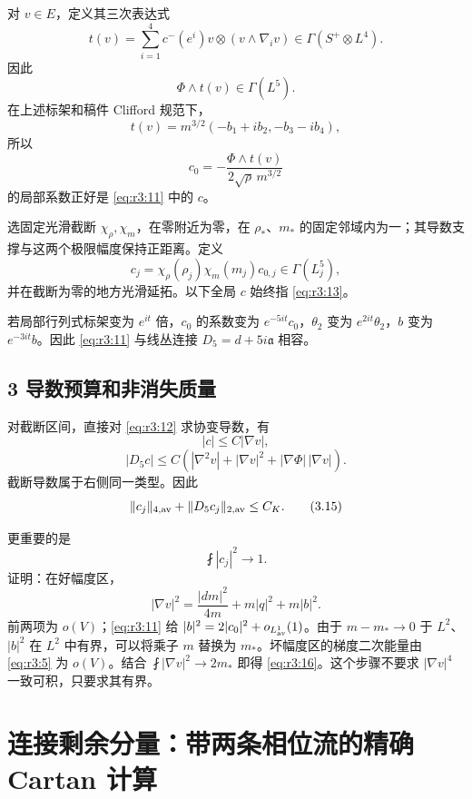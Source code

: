 \documentclass[UTF8,11pt,openany,oneside,fontset=none]{ctexbook}
\begin{document}
对 \(v\in E\)，定义其三次表达式 \[
 t(v)=\sum_{i=1}^4 c^-(e^i)v\otimes(v\wedge\nabla_i v)
       \in\Gamma(S^+\otimes L^4).
\] 因此 \[
 \Phi\wedge t(v)\in\Gamma(L^5).
\] 在上述标架和稿件 Clifford 规范下， \[
 t(v)=m^{3/2}(-b_1+ib_2,-b_3-ib_4),
\] 所以 \[
 c_0=-\frac{\Phi\wedge t(v)}{2\sqrt\rho\,m^{3/2}}
 \tag{3.12}\label{eq:r3:12}
\] 的局部系数正好是 \eqref{eq:r3:11} 中的 \(c\)。

选固定光滑截断 \(\chi_\rho,\chi_m\)，在零附近为零，在 \(\rho_*\)、\(m_*\) 的固定邻域内为一；其导数支撑与这两个极限幅度保持正距离。定义 \[
 c_j=\chi_\rho(\rho_j)\chi_m(m_j)c_{0,j}\in\Gamma(L_j^5),
 \tag{3.13}\label{eq:r3:13}
\] 并在截断为零的地方光滑延拓。以下全局 \(c\) 始终指 \eqref{eq:r3:13}。

若局部行列式标架变为 \(e^{it}\) 倍，\(c_0\) 的系数变为 \(e^{-5it}c_0\)，\(\theta_2\) 变为 \(e^{2it}\theta_2\)，\(b\) 变为 \(e^{-3it}b\)。因此 \eqref{eq:r3:11} 与线丛连接 \(D_5=d+5i\mathfrak a\) 相容。

\subsection{3 导数预算和非消失质量}\label{ch3:ux5bfcux6570ux9884ux7b97ux548cux975eux6d88ux5931ux8d28ux91cf}

对截断区间，直接对 \eqref{eq:r3:12} 求协变导数，有 \[
 |c|\le C|\nabla v|,
\] \[
 |D_5c|\le C\left(|\nabla^2v|+|\nabla v|^2
                         +|\nabla\Phi|\,|\nabla v|\right).
 \tag{3.14}\label{eq:r3:14}
\] 截断导数属于右侧同一类型。因此 \[
 \|c_j\|_{4,\rm av}+\|D_5c_j\|_{2,\rm av}\le C_K.
 \tag{3.15}\label{eq:r3:15}
\]

更重要的是 \[
 \boxed{\fint|c_j|^2\longrightarrow1.}
 \tag{3.16}\label{eq:r3:16}
\] 证明：在好幅度区， \[
 |\nabla v|^2=\frac{|dm|^2}{4m}+m|q|^2+m|b|^2.
\] 前两项为 \(o(V)\)；\eqref{eq:r3:11} 给 \(|b|^2=2|c_0|^2+o_{L^1_{\rm av}}(1)\)。由于 \(m-m_*\to0\) 于 \(L^2\)、\(|b|^2\) 在 \(L^2\) 中有界，可以将乘子 \(m\) 替换为 \(m_*\)。坏幅度区的梯度二次能量由 \eqref{eq:r3:5} 为 \(o(V)\)。结合 \(\fint|\nabla v|^2\to2m_*\) 即得 \eqref{eq:r3:16}。这个步骤不要求 \(|\nabla v|^4\) 一致可积，只要求其有界。

\section{连接剩余分量：带两条相位流的精确 Cartan 计算}\label{ch3:ux8fdeux63a5ux5269ux4f59ux5206ux91cfux5e26ux4e24ux6761ux76f8ux4f4dux6d41ux7684ux7cbeux786e-cartan-ux8ba1ux7b97}
\end{document}
